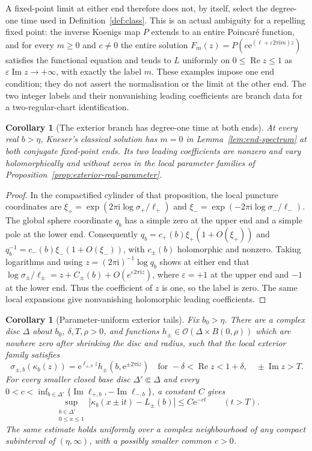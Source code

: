 \documentclass[11pt]{amsart}
\newtheorem{corollary}[theorem]{Corollary}
\theoremstyle{definition}
\newcommand{\eee}{\mathrm{e}}
\newcommand{\ii}{\mathrm{i}}
\begin{document}
A fixed-point limit at either end therefore does not, by itself,
select the degree-one time used in Definition~\ref{def:class}.
This is an actual ambiguity for a repelling fixed point: the inverse
Koenigs map $P$ extends to an entire Poincar\'e function, and for every
$m\ge0$ and $c\ne0$ the entire solution
$F_m(z)=P(c\eee^{(\ell+\varepsilon2\pi\ii m)z})$ satisfies the
functional equation and tends to $L$ uniformly on
$0\le\operatorname{Re}z\le1$ as
$\varepsilon\operatorname{Im}z\to+\infty$, with exactly the label $m$.
These examples impose one end condition; they do not assert the
normalisation or the limit at the other end.  The two integer labels
and their nonvanishing leading coefficients are branch data for a
two-regular-chart identification.

\begin{corollary}[The exterior branch has degree-one time at both ends]
\label{cor:exterior-end-labels}
At every real $b>\eta$, Kneser's classical solution has $m=0$ in
Lemma~\ref{lem:end-spectrum} at both conjugate fixed-point ends.
Its two leading coefficients are nonzero and vary holomorphically
and without zeros in the local parameter families of
Proposition~\ref{prop:exterior-real-parameter}.
\end{corollary}

\begin{proof}
In the compactified cylinder of that proposition, the local puncture
coordinates are
$\xi_+=\exp(2\pi\ii\log\sigma_+/\ell_+)$ and
$\xi_-=\exp(-2\pi\ii\log\sigma_-/\ell_-)$.  The global sphere
coordinate $q_b$ has a simple zero at the upper end and a simple pole
at the lower end.  Consequently
$q_b=c_+(b)\xi_+(1+O(\xi_+))$ and
$q_b^{-1}=c_-(b)\xi_-(1+O(\xi_-))$, with $c_\pm(b)$ holomorphic and
nonzero.  Taking logarithms and using
$z=(2\pi\ii)^{-1}\log q_b$ shows at either end that
$\log\sigma_\pm/\ell_\pm=z+C_\pm(b)+O(e^{\varepsilon2\pi\ii z})$,
where $\varepsilon=+1$ at the upper end and $-1$ at the lower end.
Thus the coefficient of $z$ is one, so the label is zero.  The same
local expansions give nonvanishing holomorphic leading coefficients.
\end{proof}

\begin{corollary}[Parameter-uniform exterior tails]
\label{cor:exterior-uniform-tails}
Fix $b_0>\eta$.  There are a complex disc $\Delta$ about $b_0$,
$\delta,T,\rho>0$, and functions
$h_\pm\in\mathcal O(\Delta\times B(0,\rho))$ which are nowhere zero
after shrinking the disc and radius, such that the local exterior
family satisfies
\[
 \sigma_{\pm,b}(\kappa_b(z))
   =\eee^{\ell_{\pm,b}z}
      h_\pm(b,\eee^{\pm2\pi\ii z})
 \quad\text{for }-\delta<\operatorname{Re}z<1+\delta,
       \quad\pm\operatorname{Im}z>T.
\]
For every smaller closed base disc $\Delta'\Subset\Delta$ and every
$0<c<\inf_{b\in\Delta'}\{\operatorname{Im}\ell_{+,b},
-\operatorname{Im}\ell_{-,b}\}$, a constant $C$ gives
\[
 \sup_{\substack{b\in\Delta'\\0\le x\le1}}
 |\kappa_b(x\pm\ii t)-L_\pm(b)|\le C\eee^{-ct}
 \qquad(t>T).
\]
The same estimate holds uniformly over a complex neighbourhood of
any compact subinterval of $(\eta,\infty)$, with a possibly smaller
common $c>0$.
\end{corollary}
\end{document}
